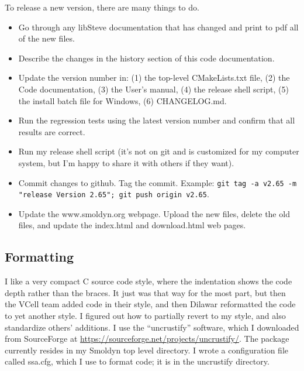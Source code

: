 \documentclass {scrbook}
\newcommand {\ttt} {\texttt}
\begin{document}
To release a new version, there are many things to do.
\begin{itemize}

\item Go through any libSteve documentation that has changed and print to pdf all of the new files.

\item Describe the changes in the history section of this code documentation.

\item Update the version number in: (1) the top-level CMakeLists.txt file, (2) the Code documentation, (3) the User's manual, (4) the release shell script, (5) the install batch file for Windows, (6) CHANGELOG.md.

\item Run the regression tests using the latest version number and confirm that all results are correct.

\item Run my release shell script (it's not on git and is customized for my computer system, but I'm happy to share it with others if they want).

\item Commit changes to github. Tag the commit. Example: \ttt{git tag -a v2.65 -m "release Version 2.65"; git push origin v2.65}.

\item Update the www.smoldyn.org webpage. Upload the new files, delete the old files, and update the index.html and download.html web pages.

\end{itemize}

\subsection{Formatting}

I like a very compact C source code style, where the indentation shows the code depth rather than the braces. It just was that way for the most part, but then the VCell team added code in their style, and then Dilawar reformatted the code to yet another style. I figured out how to partially revert to my style, and also standardize others' additions. I use the ``uncrustify'' software, which I downloaded from SourceForge at \url{https://sourceforge.net/projects/uncrustify/}. The package currently resides in my Smoldyn top level directory. I wrote a configuration file called ssa.cfg, which I use to format code; it is in the uncrustify directory.
\end{document}
